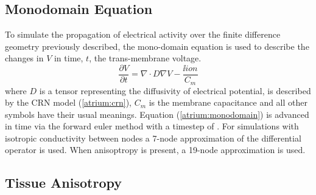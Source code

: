 \subsection{Monodomain Equation}

To simulate the propagation of electrical activity over the finite difference
geometry previously described, the mono-domain equation is used to describe the
changes in $V$ in time, $t$, the trans-membrane voltage.
\begin{equation}
\label{atrium:monodomain}
\frac{\partial V}{\partial t} = \nabla\cdot D \nabla V - \frac{\ii{ion}}{C_{m}}
\end{equation}
where $D$ is a tensor representing the diffusivity of electrical potential,  is described by the
CRN model (\ref{atrium:crn}), $C_{m}$ is the membrane capacitance and all other
symbols have their usual meanings.  Equation (\ref{atrium:monodomain}) is
advanced in time via the forward euler method with a timestep of .  For
simulations with isotropic conductivity between nodes a 7-node approximation of
the differential operator is used.  When anisoptropy is present, a 19-node
approximation is used.

\subsection{Tissue Anisotropy}


